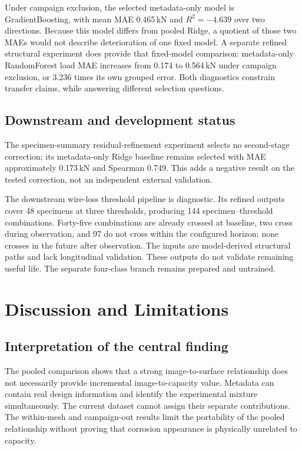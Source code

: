 \documentclass[conference]{IEEEtran}
\begin{document}
Under campaign exclusion, the selected metadata-only model is GradientBoosting, with mean MAE 0.465\,kN and $R^2=-4.639$ over two directions. Because this model differs from pooled Ridge, a quotient of those two MAEs would not describe deterioration of one fixed model. A separate refined structural experiment does provide that fixed-model comparison: metadata-only RandomForest load MAE increases from 0.174 to 0.564\,kN under campaign exclusion, or 3.236 times its own grouped error. Both diagnostics constrain transfer claims, while answering different selection questions.

\subsection{Downstream and development status}
The specimen-summary residual-refinement experiment selects no second-stage correction; its metadata-only Ridge baseline remains selected with MAE approximately 0.173\,kN and Spearman 0.749. This adds a negative result on the tested correction, not an independent external validation.

The downstream wire-loss threshold pipeline is diagnostic. Its refined outputs cover 48 specimens at three thresholds, producing 144 specimen--threshold combinations. Forty-five combinations are already crossed at baseline, two cross during observation, and 97 do not cross within the configured horizon; none crosses in the future after observation. The inputs are model-derived structural paths and lack longitudinal validation. These outputs do not validate remaining useful life. The separate four-class branch remains prepared and untrained.

\section{Discussion and Limitations}
\subsection{Interpretation of the central finding}
The pooled comparison shows that a strong image-to-surface relationship does not necessarily provide incremental image-to-capacity value. Metadata can contain real design information and identify the experimental mixture simultaneously. The current dataset cannot assign their separate contributions. The within-mesh and campaign-out results limit the portability of the pooled relationship without proving that corrosion appearance is physically unrelated to capacity.
\end{document}
